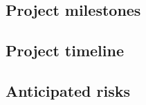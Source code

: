 \documentclass[../main.tex]{subfiles}
\begin{document}
\subsection{Project milestones}

\lipsum[1]

\subsection{Project timeline}

\lipsum[1]

\subsection{Anticipated risks}

\lipsum[1]
\end{document}
